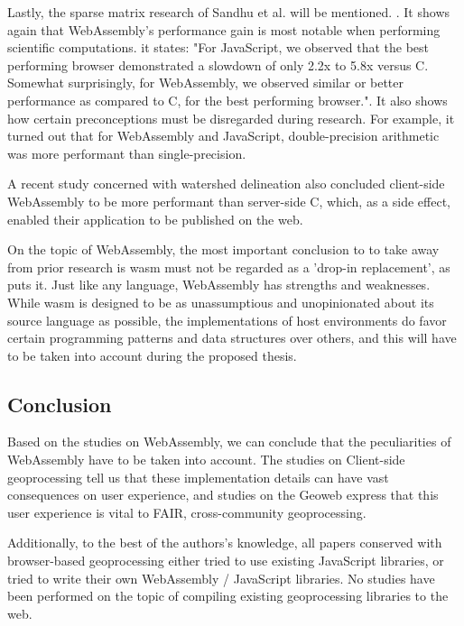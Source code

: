 Lastly, the sparse matrix research of Sandhu et al. will be mentioned. \cite{sandhu_sparse_2018}. It shows again that WebAssembly's performance gain is most notable when performing scientific computations. it states: "For JavaScript, we observed that the best performing browser demonstrated a slowdown of only 2.2x to 5.8x versus C. Somewhat surprisingly, for WebAssembly, we observed similar or better performance as compared to C, for the best performing browser.". It also shows how certain preconceptions must be disregarded during research. For example, it turned out that for WebAssembly and JavaScript, double-precision arithmetic was more performant than single-precision.

A recent study concerned with watershed delineation \cite{sit_optimized_2019} also concluded client-side WebAssembly to be more performant than server-side C, which, as a side effect, enabled their application to be published on the web. 

On the topic of WebAssembly, the most important conclusion to to take away from prior research is \ac{wasm} must not be regarded as a 'drop-in replacement', as \cite{melch_performance_2019} puts it. Just like any language, WebAssembly has strengths and weaknesses. While \ac{wasm} is designed to be as unassumptious and unopinionated about its source language as possible, the implementations of host environments do favor certain programming patterns and data structures over others, and this will have to be taken into account during the proposed thesis.


\subsection{Conclusion}

Based on the studies on WebAssembly, we can conclude that the peculiarities of WebAssembly have to be taken into account. The studies on Client-side geoprocessing tell us that these implementation details can have vast consequences on user experience, and studies on the Geoweb express that this user experience is vital to FAIR, cross-community geoprocessing.

Additionally, to the best of the authors's knowledge, all papers conserved with browser-based geoprocessing either tried to use existing JavaScript libraries, or tried to write their own WebAssembly / JavaScript libraries. No studies have been performed on the topic of compiling existing geoprocessing libraries to the web. 
